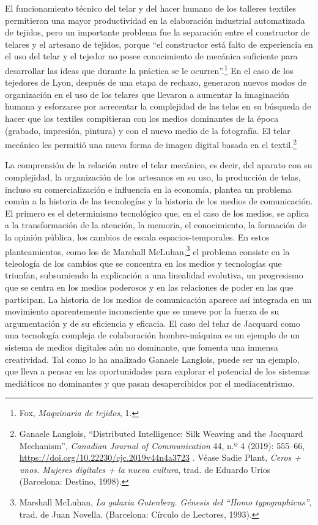 \documentclass{tufte-handout}
\begin{document}
El funcionamiento técnico del telar y del hacer humano de los talleres
textiles permitieron una mayor productividad en la elaboración
industrial automatizada de tejidos, pero un importante problema fue la
separación entre el constructor de telares y el artesano de tejidos,
porque ``el constructor está falto de experiencia en el uso del telar y
el tejedor no posee conocimiento de mecánica suficiente para desarrollar
las ideas que durante la práctica se le ocurren''.\footnote{Fox,
  \emph{Maquinaria de tejidos}, 1.} En el caso de los tejedores de Lyon,
después de una etapa de rechazo, generaron nuevos modos de organización
en el uso de los telares que llevaron a aumentar la imaginación humana y
esforzarse por acrecentar la complejidad de las telas en su búsqueda de
hacer que los textiles compitieran con los medios dominantes de la época
(grabado, impresión, pintura) y con el nuevo medio de la fotografía. El
telar mecánico les permitió una nueva forma de imagen digital basada en
el textil.\footnote{Ganaele Langlois, ``Distributed Intelligence: Silk
  Weaving and the Jacquard Mechanism'', \emph{Canadian Journal of
  Communication} 44, n.º 4 (2019): 555--66,
  \url{https://doi.org/10.22230/cjc.2019v44n4a3723} . Véase Sadie Plant,
  \emph{Ceros + unos. Mujeres digitales + la nueva cultura}, trad. de
  Eduardo Urios (Barcelona: Destino, 1998).}

La comprensión de la relación entre el telar mecánico, es decir, del
aparato con su complejidad, la organización de los artesanos en su uso,
la producción de telas, incluso su comercialización e influencia en la
economía, plantea un problema común a la historia de las tecnologías y
la historia de los medios de comunicación. El primero es el determinismo
tecnológico que, en el caso de los medios, se aplica a la transformación
de la atención, la memoria, el conocimiento, la formación de la opinión
pública, los cambios de escala espacios-temporales. En estos
planteamientos, como los de Marshall McLuhan,\footnote{Marshall McLuhan,
  \emph{La galaxia Gutenberg. Génesis del ``Homo typographicus''}, trad.
  de Juan Novella. (Barcelona: Círculo de Lectores, 1993).} el problema
consiste en la teleología de los cambios que se concentra en los medios
y tecnologías que triunfan, subsumiendo la explicación a una linealidad
evolutiva, un progresismo que se centra en los medios poderosos y en las
relaciones de poder en las que participan. La historia de los medios de
comunicación aparece así integrada en un movimiento aparentemente
inconsciente que se mueve por la fuerza de su argumentación y de su
eficiencia y eficacia. El caso del telar de Jacquard como una tecnología
compleja de colaboración hombre-máquina es un ejemplo de un sistema de
medios digitales aún no dominante, que fomenta una inmensa creatividad.
Tal como lo ha analizado Ganaele Langlois, puede ser un ejemplo, que
lleva a pensar en las oportunidades para explorar el potencial de los
sistemas mediáticos no dominantes y que pasan desapercibidos por el
mediacentrismo.
\end{document}
